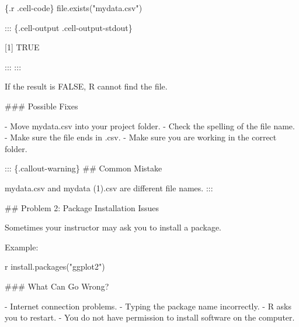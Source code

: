 \documentclass[
  letterpaper,
  DIV=11,
  numbers=noendperiod]{scrartcl}
\newenvironment{Shaded}{\begin{snugshade}}{\end{snugshade}}
\newcommand{\FunctionTok}[1]{\textcolor[rgb]{0.28,0.35,0.67}{#1}}
\newcommand{\InformationTok}[1]{\textcolor[rgb]{0.37,0.37,0.37}{#1}}
\newcommand{\NormalTok}[1]{\textcolor[rgb]{0.00,0.23,0.31}{#1}}
\newcommand{\SpecialStringTok}[1]{\textcolor[rgb]{0.13,0.47,0.30}{#1}}
\newcommand{\StringTok}[1]{\textcolor[rgb]{0.13,0.47,0.30}{#1}}
\begin{document}
\begin{Shaded}
\begin{Highlighting}[]
\InformationTok{\textasciigrave{}\textasciigrave{}\textasciigrave{}\{.r .cell{-}code\}}
\FunctionTok{file.exists}\NormalTok{(}\StringTok{"mydata.csv"}\NormalTok{)}
\InformationTok{\textasciigrave{}\textasciigrave{}\textasciigrave{}}

\NormalTok{::: \{.cell{-}output .cell{-}output{-}stdout\}}

\InformationTok{\textasciigrave{}\textasciigrave{}\textasciigrave{}}
\InformationTok{[1] TRUE}
\InformationTok{\textasciigrave{}\textasciigrave{}\textasciigrave{}}


\NormalTok{:::}
\NormalTok{:::}


\NormalTok{If the result is }\InformationTok{\textasciigrave{}FALSE\textasciigrave{}}\NormalTok{, R cannot find the file.}

\FunctionTok{\#\#\# Possible Fixes}

\SpecialStringTok{{-} }\NormalTok{Move }\InformationTok{\textasciigrave{}mydata.csv\textasciigrave{}}\NormalTok{ into your project folder.}
\SpecialStringTok{{-} }\NormalTok{Check the spelling of the file name.}
\SpecialStringTok{{-} }\NormalTok{Make sure the file ends in }\InformationTok{\textasciigrave{}.csv\textasciigrave{}}\NormalTok{.}
\SpecialStringTok{{-} }\NormalTok{Make sure you are working in the correct folder.}

\NormalTok{::: \{.callout{-}warning\}}
\FunctionTok{\#\# Common Mistake}

\InformationTok{\textasciigrave{}mydata.csv\textasciigrave{}}\NormalTok{ and }\InformationTok{\textasciigrave{}mydata (1).csv\textasciigrave{}}\NormalTok{ are different file names.}
\NormalTok{:::}

\FunctionTok{\#\# Problem 2: Package Installation Issues}

\NormalTok{Sometimes your instructor may ask you to install a package.}

\NormalTok{Example:}

\InformationTok{\textasciigrave{}\textasciigrave{}\textasciigrave{}r}
\FunctionTok{install.packages}\NormalTok{(}\StringTok{"ggplot2"}\NormalTok{)}
\InformationTok{\textasciigrave{}\textasciigrave{}\textasciigrave{}}

\FunctionTok{\#\#\# What Can Go Wrong?}

\SpecialStringTok{{-} }\NormalTok{Internet connection problems.}
\SpecialStringTok{{-} }\NormalTok{Typing the package name incorrectly.}
\SpecialStringTok{{-} }\NormalTok{R asks you to restart.}
\SpecialStringTok{{-} }\NormalTok{You do not have permission to install software on the computer.}


\end{Highlighting}
\end{Shaded}
\end{document}
